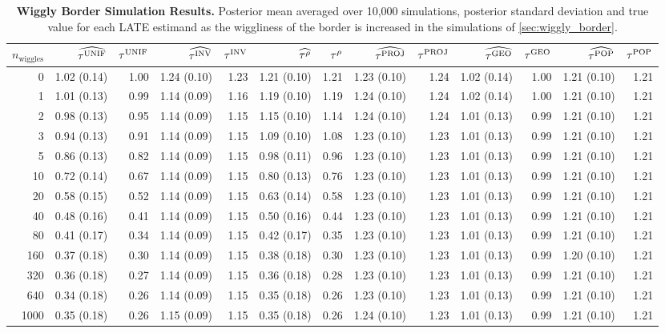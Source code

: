 \begin{landscape}
	\begin{table}[p]
    	\begin{tabular}{r|rrrrrrrrrrrr}
        	\hline
        	\(n_{\mathrm{wiggles}}\) & \(\widehat{\tau^{\mathrm{UNIF}}}\) & \(\tau^{\mathrm{UNIF}}\) & \(\widehat{\tau^{\mathrm{INV}}}\) & \(\tau^{\mathrm{INV}}\) & \(\widehat{\tau^{\rho}}\) & \(\tau^{\rho}\) & \(\widehat{\tau^{\mathrm{PROJ}}}\) & \(\tau^{\mathrm{PROJ}}\) & \(\widehat{\tau^{\mathrm{GEO}}}\) & \(\tau^{\mathrm{GEO}}\) & \(\widehat{\tau^{\mathrm{POP}}}\) & \(\tau^{\mathrm{POP}}\)\\
        	\hline
			0 & 1.02 (0.14) & 1.00 & 1.24 (0.10) & 1.23 & 1.21 (0.10) & 1.21 & 1.23 (0.10) & 1.24 & 1.02 (0.14) & 1.00 & 1.21 (0.10) & 1.21 \\
			1 & 1.01 (0.13) & 0.99 & 1.14 (0.09) & 1.16 & 1.19 (0.10) & 1.19 & 1.24 (0.10) & 1.24 & 1.02 (0.14) & 1.00 & 1.21 (0.10) & 1.21 \\
			2 & 0.98 (0.13) & 0.95 & 1.14 (0.09) & 1.15 & 1.15 (0.10) & 1.14 & 1.24 (0.10) & 1.24 & 1.01 (0.13) & 0.99 & 1.21 (0.10) & 1.21 \\
			3 & 0.94 (0.13) & 0.91 & 1.14 (0.09) & 1.15 & 1.09 (0.10) & 1.08 & 1.23 (0.10) & 1.23 & 1.01 (0.13) & 0.99 & 1.21 (0.10) & 1.21 \\
			5 & 0.86 (0.13) & 0.82 & 1.14 (0.09) & 1.15 & 0.98 (0.11) & 0.96 & 1.23 (0.10) & 1.23 & 1.01 (0.13) & 0.99 & 1.21 (0.10) & 1.21 \\
			10 & 0.72 (0.14) & 0.67 & 1.14 (0.09) & 1.15 & 0.80 (0.13) & 0.76 & 1.23 (0.10) & 1.23 & 1.01 (0.13) & 0.99 & 1.21 (0.10) & 1.21 \\
			20 & 0.58 (0.15) & 0.52 & 1.14 (0.09) & 1.15 & 0.63 (0.14) & 0.58 & 1.23 (0.10) & 1.23 & 1.01 (0.13) & 0.99 & 1.21 (0.10) & 1.21 \\
			40 & 0.48 (0.16) & 0.41 & 1.14 (0.09) & 1.15 & 0.50 (0.16) & 0.44 & 1.23 (0.10) & 1.23 & 1.01 (0.13) & 0.99 & 1.21 (0.10) & 1.21 \\
			80 & 0.41 (0.17) & 0.34 & 1.14 (0.09) & 1.15 & 0.42 (0.17) & 0.35 & 1.23 (0.10) & 1.23 & 1.01 (0.13) & 0.99 & 1.21 (0.10) & 1.21 \\
			160 & 0.37 (0.18) & 0.30 & 1.14 (0.09) & 1.15 & 0.38 (0.18) & 0.30 & 1.23 (0.10) & 1.23 & 1.01 (0.13) & 0.99 & 1.20 (0.10) & 1.21 \\
			320 & 0.36 (0.18) & 0.27 & 1.14 (0.09) & 1.15 & 0.36 (0.18) & 0.28 & 1.23 (0.10) & 1.23 & 1.01 (0.13) & 0.99 & 1.21 (0.10) & 1.21 \\
			640 & 0.34 (0.18) & 0.26 & 1.14 (0.09) & 1.15 & 0.35 (0.18) & 0.26 & 1.23 (0.10) & 1.23 & 1.01 (0.13) & 0.99 & 1.21 (0.10) & 1.21 \\
			1000 & 0.35 (0.18) & 0.26 & 1.15 (0.09) & 1.15 & 0.35 (0.18) & 0.26 & 1.24 (0.10) & 1.23 & 1.01 (0.13) & 0.99 & 1.21 (0.10) & 1.21 \\
			\hline
    	\end{tabular}
    	\caption{
        	\textbf{Wiggly Border Simulation Results.} 
        	Posterior mean averaged over 10,000 simulations, posterior standard deviation and true value for each LATE estimand as the wiggliness of the border is increased in the simulations of \autoref{sec:wiggly_border}.
        	\label{table:wiggly_results}
        	}
	\end{table}
\end{landscape}

